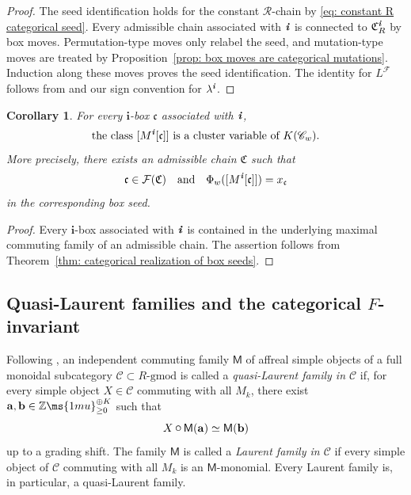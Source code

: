 \documentclass[12pt, leqno]{amsart}
\numberwithin{equation}{section}
\theoremstyle{plain}
\newtheorem{corollary}[lemma]{Corollary}
\theoremstyle{definition}
\newcommand{\conv}{\mathop{\mathbin{\mbox{\large $\circ$}}}}
\newcommand{\Z}{\mathbb{Z}\ms{1mu}}
\newcommand{\ii}{ \textbf{\textit{i}}}
\newcommand{\frakC}{\mathfrak{C}}
\newcommand{\frakc}{\mathfrak{c}}
\newcommand{\sfM}{\mathsf{M}}
\newcommand{\bfa}{\mathbf{a}}
\newcommand{\bfb}{\mathbf{b}}
\newcommand{\bfi}{\mathbf{i}}
\newcommand{\calF}{\mathcal{F}}
\newcommand{\calR}{\mathcal{R}}
\newcommand{\scrC}{\mathscr{C}}
\newcommand{\qtq}[1][{and}]{\quad\text{{#1}}\quad}
\begin{document}
\begin{proof}
The seed identification holds for the constant \(\calR\)-chain by
\eqref{eq: constant R categorical seed}.
Every admissible chain associated with \(\ii\) is connected to
\(\frakC_R^\ii\) by box moves.
Permutation-type moves only relabel the seed, and mutation-type
moves are treated by
Proposition~\ref{prop: box moves are categorical mutations}.
Induction along these moves proves the seed identification.
The identity for \(L^\calF\) follows from
\cite[Propositions~5.7 and~5.9]{KKOP23F}
and our sign convention for \(\lambda^\ii\).
\end{proof}


\begin{corollary}\label{cor: every box module is a cluster variable}
For every \(\bfi\)-box \(\frakc\) associated with \(\ii\), 
\[
\text{the class $[M^\ii[\frakc]]$ is a cluster variable of \(K(\scrC_w)\).}
\]
More precisely, there
exists an admissible chain \(\frakC\) such that
\[
\frakc\in\calF(\frakC) \qtq  \Phi_w([M^\ii[\frakc]])=x_\frakc
\]
in the corresponding box seed.
\end{corollary}

\begin{proof}
Every \(\bfi\)-box associated with \(\ii\) is contained in the
underlying maximal commuting family of an admissible chain.  The
assertion follows from
Theorem~\ref{thm: categorical realization of box seeds}.
\end{proof}


\subsection{Quasi-Laurent families and the categorical
\texorpdfstring{\(F\)}{F}-invariant}
\label{subsec: quasi-Laurent families}

Following \cite[Definition~3.2]{KKOP23F},   an independent commuting
family \(\sfM\) of affreal simple objects of a full monoidal
subcategory \(\scrC\subset R\text{-gmod}\) is called a
\emph{quasi-Laurent family in \(\scrC\)}
if, for every simple object \(X\in\scrC\) commuting with all
\(M_k\), there exist 
\(\bfa,\bfb\in\Z_{\geq0}^{\oplus K}\) such that
\[
X\conv\sfM(\bfa)\simeq\sfM(\bfb)
\]
up to a grading shift.  The family \(\sfM\) is called a \emph{Laurent family in \(\scrC\)}
if every simple object of \(\scrC\) commuting with all \(M_k\)
is an \(\sfM\)-monomial.  Every Laurent family is, in particular, a
quasi-Laurent family.
\end{document}
